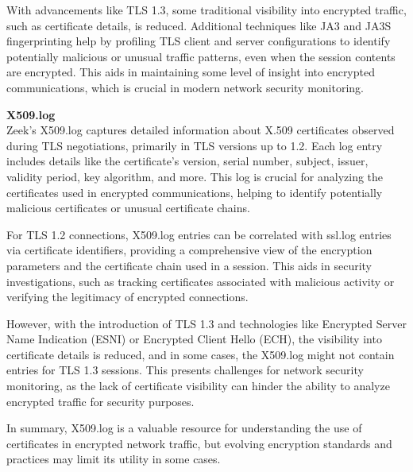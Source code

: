 With advancements like TLS 1.3, some traditional visibility into encrypted traffic, such as certificate details, is reduced. Additional techniques like JA3 and JA3S fingerprinting help by profiling TLS client and server configurations to identify potentially malicious or unusual traffic patterns, even when the session contents are encrypted. This aids in maintaining some level of insight into encrypted communications, which is crucial in modern network security monitoring.
\\
\vspace{1cm}



\noindent \Large \textbf{X509.log}
\vspace{5pt}
\\
\normalsize
Zeek's \colorbox{gray!20}{X509.log} captures detailed information about X.509 certificates observed during TLS negotiations, primarily in TLS versions up to 1.2. Each log entry includes details like the certificate's version, serial number, subject, issuer, validity period, key algorithm, and more. This log is crucial for analyzing the certificates used in encrypted communications, helping to identify potentially malicious certificates or unusual certificate chains.

For TLS 1.2 connections, \colorbox{gray!20}{X509.log} entries can be correlated with \colorbox{gray!20}{ssl.log} entries via certificate identifiers, providing a comprehensive view of the encryption parameters and the certificate chain used in a session. This aids in security investigations, such as tracking certificates associated with malicious activity or verifying the legitimacy of encrypted connections.

However, with the introduction of TLS 1.3 and technologies like Encrypted Server Name Indication (ESNI) or Encrypted Client Hello (ECH), the visibility into certificate details is reduced, and in some cases, the \colorbox{gray!20}{X509.log} might not contain entries for TLS 1.3 sessions. This presents challenges for network security monitoring, as the lack of certificate visibility can hinder the ability to analyze encrypted traffic for security purposes.

In summary, \colorbox{gray!20}{X509.log} is a valuable resource for understanding the use of certificates in encrypted network traffic, but evolving encryption standards and practices may limit its utility in some cases.

\\
\vspace{1cm}


